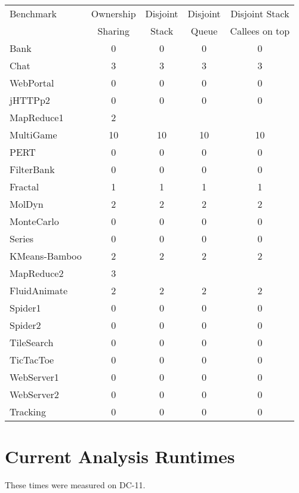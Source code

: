 \documentclass{amsart}[9pt]
\begin{document}
\begin{tabular}{|l|c|c|c|c|}
\hline
Benchmark     & Ownership & Disjoint & Disjoint & Disjoint Stack \\
              & Sharing   & Stack    & Queue    & Callees on top \\
\hline
Bank          & 0         & 0  & 0  &  0          \\
Chat          & 3         & 3  & 3  &  3          \\
WebPortal     & 0         & 0  & 0  &  0          \\
jHTTPp2       & 0         & 0  & 0  &  0          \\
MapReduce1    & 2         & \color{red}{1}  & \color{red}{1}  &  \color{red}{1}          \\
MultiGame     & 10        & 10 & 10 &  10         \\
PERT          & 0         & 0  & 0  &  0          \\
FilterBank    & 0         & 0  & 0  &  0          \\
Fractal       & 1         & 1  & 1  &  1          \\
MolDyn        & 2         & 2  & 2  &  2          \\
MonteCarlo    & 0         & 0  & 0  &  0          \\
Series        & 0         & 0  & 0  &  0          \\
KMeans-Bamboo & 2         & 2  & 2  &  2          \\
MapReduce2    & 3         & \color{red}{0}  & \color{red}{0}  &  \color{red}{0}          \\
FluidAnimate  & 2         & 2  & 2  &  2          \\
Spider1       & 0         & 0  & 0  &  0          \\
Spider2       & 0         & 0  & 0  &  0          \\
TileSearch    & 0         & 0  & 0  &  0          \\
TicTacToe     & 0         & 0  & 0  &  0          \\
WebServer1    & 0         & 0  & 0  &  0          \\
WebServer2    & 0         & 0  & 0  &  0          \\
Tracking      & 0         & 0  & 0  &  0          \\
\hline
\end{tabular}



\section{Current Analysis Runtimes}
These times were measured on DC-11.
\end{document}
